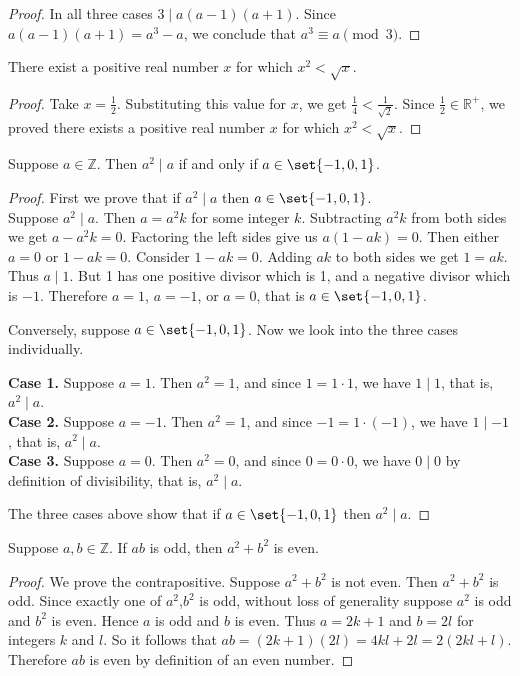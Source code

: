 \documentclass[DIN, pagenumber=false, fontsize=11pt, parskip=half]{scrartcl}
\begin{document}
\begin{problems}
\begin{proof}
        In all three cases $3 \mid a(a-1)(a+1)$.
        Since $a(a-1)(a+1) = a^3-a$, we conclude that $a^3 \equiv a \pmod{3}$.
    \end{proof}
    
    \problem There exist a positive real number $x$ for which $x^2 < \sqrt{x}$.
    \begin{proof}
        Take $x = \frac{1}{2}$.
        Substituting this value for $x$, we get $\frac{1}{4} < \frac{1}{\sqrt{2}}$.
        Since $\frac{1}{2} \in \mathbb{R}^+$, we proved there exists a positive real number $x$ for which $x^2 < \sqrt{x}$.
    \end{proof}

    \problem Suppose $a \in \mathbb{Z}$. Then $a^2 \mid a$ if and only if $a \in \set{-1,0,1}$.
    \begin{proof}
        First we prove that if $a^2 \mid a$ then $a \in \set{-1,0,1}$.\\ 
        Suppose $a^2 \mid a$. Then $a = a^2k$ for some integer $k$.
        Subtracting $a^2k$ from both sides we get $a-a^2k=0$.
        Factoring the left sides give us $a(1-ak)=0$.
        Then either $a=0$ or $1-ak=0$.
        Consider $1-ak=0$.
        Adding $ak$ to both sides we get $1=ak$.
        Thus $a \mid 1$.
        But 1 has one positive divisor which is 1, and a negative divisor which is $-1$.
        Therefore $a=1$, $a=-1$, or $a=0$, that is $a \in \set{-1,0,1}$.

        Conversely, suppose $a \in \set{-1,0,1}$.
        Now we look into the three cases individually.

        \textbf{Case 1.} Suppose $a=1$. Then $a^2 = 1$, and since $1 = 1 \cdot 1$, we have $1 \mid 1$, that is, $a^2 \mid a$.\\
        \textbf{Case 2.} Suppose $a=-1$. Then $a^2 = 1$, and since $-1 = 1 \cdot (-1)$, we have $1 \mid -1$, that is, $a^2 \mid a$.\\
        \textbf{Case 3.} Suppose $a=0$. Then $a^2 = 0$, and since $0 = 0 \cdot 0$, we have $0 \mid 0$ by definition of divisibility, that is, $a^2 \mid a$.

        The three cases above show that if $a \in \set{-1,0,1}$ then $a^2 \mid a$.
    \end{proof}

    \problem Suppose $a,b \in \mathbb{Z}$. If $ab$ is odd, then $a^2+b^2$ is even.
    \begin{proof}
        We prove the contrapositive.
        Suppose $a^2 + b^2$ is not even.
        Then $a^2 + b^2$ is odd.
        Since exactly one of $a^2$,$b^2$ is odd, without loss of generality suppose
        $a^2$ is odd and $b^2$ is even.
        Hence $a$ is odd and $b$ is even.
        Thus $a=2k+1$ and $b=2l$ for integers $k$ and $l$.
        So it follows that $ab = (2k+1)(2l) = 4kl+2l = 2(2kl+l)$.
        Therefore $ab$ is even by definition of an even number.
    \end{proof}


\end{problems}
\end{document}
